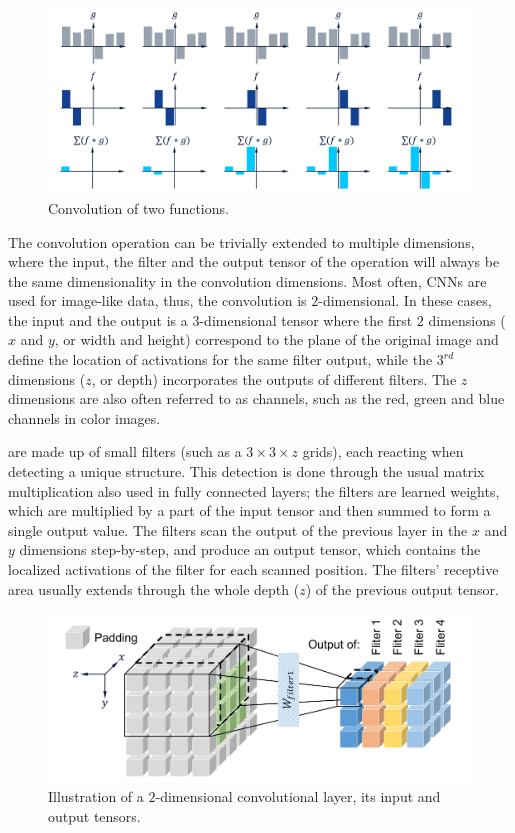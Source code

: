 			\begin{figure}[ht]
				\centering
				\includegraphics[width=\linewidth]{figures/02_deep_learning/convolution/convolution.pdf}
				\caption[Convolution of two functions]{Convolution of two functions.}
				\label{fig:convolution}
			\end{figure}
		
			The convolution operation can be trivially extended to multiple dimensions, where the input, the filter and the output tensor of the operation will always be the same dimensionality in the convolution dimensions.
			Most often, \acp{CNN} are used for image-like data, thus, the convolution is $2$-dimensional.
			In these cases, the input and the output is a $3$-dimensional tensor where the first $2$ dimensions ($x$ and $y$, or width and height) correspond to the plane of the original image and define the location of activations for the same filter output, while the $3^{rd}$ dimensions ($z$, or depth) incorporates the outputs of different filters.
			The $z$ dimensions are also often referred to as channels, such as the red, green and blue channels in color images.
			
			 are made up of small filters (such as a $3\times3\times{z}$ grids), each reacting when detecting a unique structure.
			This detection is done through the usual matrix multiplication also used in fully connected layers; the filters are learned weights, which are multiplied by a part of the input tensor and then summed to form a single output value.
			The filters scan the output of the previous layer in the $x$ and $y$ dimensions step-by-step, and produce an output tensor, which contains the localized activations of the filter for each scanned position.
			The filters' receptive area usually extends through the whole depth ($z$) of the previous output tensor.
			
			\begin{figure}[ht]
				\centering
				\includegraphics[width=0.8\linewidth]{figures/02_deep_learning/conv_layer/conv_layer.pdf}
				\caption[Convolutional layer]{Illustration of a $2$-dimensional convolutional layer, its input and output tensors.}
				\label{fig:conv_layer}
			\end{figure}
		
